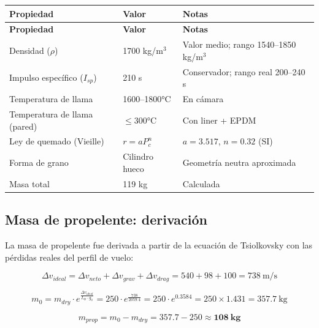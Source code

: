 \documentclass[11pt, a4paper]{article}
\begin{document}
\begin{longtable}{L{5cm} C{3cm} L{5.5cm}}
  \color{white}\textbf{Propiedad} &
  \color{white}\textbf{Valor} &
  \color{white}\textbf{Notas} \\
  \endfirsthead
  \color{white}\textbf{Propiedad} &
  \color{white}\textbf{Valor} &
  \color{white}\textbf{Notas} \\
  \endhead
  Densidad ($\rho$)                   & 1700 kg/m$^3$  & Valor medio; rango 1540--1850 kg/m$^3$ \\
  Impulso espec\'{i}fico ($I_{sp}$)   & 210 s          & Conservador; rango real 200--240 s \\
  Temperatura de llama                & 1600--1800°C   & En c\'{a}mara \\
  Temperatura de llama (pared)        & $\leq$300°C    & Con liner + EPDM \\
  Ley de quemado (Vieille)            & $r = a P_c^n$  & $a=3.517$, $n=0.32$ (SI) \\
  Forma de grano                      & Cilindro hueco & Geometr\'{i}a neutra aproximada \\
  Masa total                          & 119 kg         & Calculada \\
\end{longtable}

\subsection{Masa de propelente: derivaci\'{o}n}

La masa de propelente fue derivada a partir de la ecuaci\'{o}n de Tsiolkovsky con las p\'{e}rdidas reales del perfil de vuelo:

\begin{equation}
  \Delta v_{ideal} = \Delta v_{neto} + \Delta v_{grav} + \Delta v_{drag}
  = 540 + 98 + 100 = 738\ \text{m/s}
\end{equation}

\begin{equation}
  m_0 = m_{dry} \cdot e^{\frac{\Delta v_{ideal}}{I_{sp} \cdot g_0}}
  = 250 \cdot e^{\frac{738}{2059.4}} = 250 \cdot e^{0.3584}
  = 250 \times 1.431 = 357.7\ \text{kg}
\end{equation}

\begin{equation}
  m_{prop} = m_0 - m_{dry} = 357.7 - 250 \approx \mathbf{108\ \text{kg}}
\end{equation}
\end{document}

